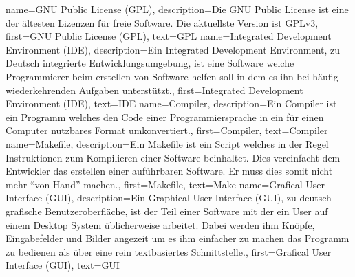 {
    name={GNU Public License (GPL)},
    description={Die GNU Public License ist eine der ältesten Lizenzen für
      freie Software. Die aktuellste Version ist GPLv3},
    first={GNU Public License (GPL)},
    text={GPL}
}
{
    name={Integrated Development Environment (IDE)},
    description={Ein Integrated Development Environment, zu Deutsch integrierte
        Entwicklungsumgebung, ist eine Software welche Programmierer beim
        erstellen von Software helfen soll in dem es ihn bei häufig
        wiederkehrenden Aufgaben unterstützt.},
    first={Integrated Development Environment (IDE)},
    text={IDE}
}
{
    name={Compiler},
    description={Ein Compiler ist ein Programm welches den Code einer
      Programmiersprache in ein für einen Computer nutzbares Format
      umkonvertiert.},
    first={Compiler},
    text={Compiler}
}
{
    name={Makefile},
    description={Ein Makefile ist ein Script welches in der Regel Instruktionen
    zum Kompilieren einer Software beinhaltet. Dies vereinfacht dem Entwickler
    das erstellen einer auführbaren Software. Er muss dies somit nicht mehr
    ``von Hand'' machen.},
    first={Makefile},
    text={Make}
}
{
    name={Grafical User Interface (GUI)},
    description={Ein Graphical User Interface (GUI), zu deutsch grafische
      Benutzeroberfläche, ist der Teil einer Software mit der ein User auf
      einem Desktop System üblicherweise arbeitet. Dabei werden ihm Knöpfe,
      Eingabefelder und Bilder angezeit um es ihm einfacher zu machen das
      Programm zu bedienen als über eine rein textbasiertes Schnittstelle.},
    first={Grafical User Interface (GUI)},
    text={GUI}
}